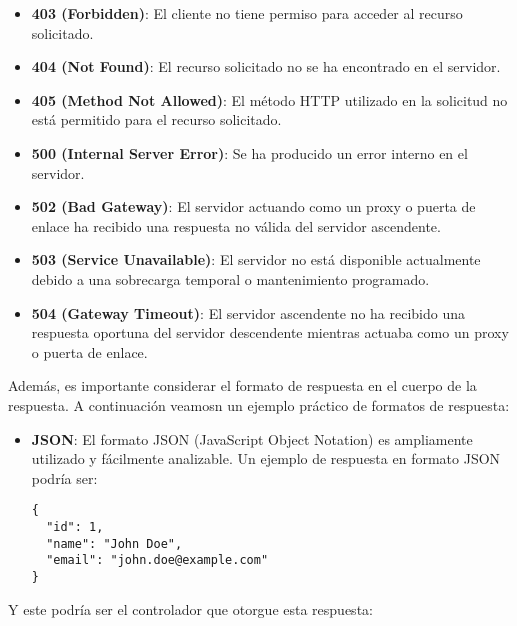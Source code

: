 \documentclass[executivepaper]{article}
\begin{document}
\begin{itemize}
    \item \textbf{403 (Forbidden)}: El cliente no tiene permiso para acceder al recurso solicitado.
    
    \item \textbf{404 (Not Found)}: El recurso solicitado no se ha encontrado en el servidor.
    
    \item \textbf{405 (Method Not Allowed)}: El método HTTP utilizado en la solicitud no está permitido para el recurso solicitado.
    
    \item \textbf{500 (Internal Server Error)}: Se ha producido un error interno en el servidor.
    
    \item \textbf{502 (Bad Gateway)}: El servidor actuando como un proxy o puerta de enlace ha recibido una respuesta no válida del servidor ascendente.
    
    \item \textbf{503 (Service Unavailable)}: El servidor no está disponible actualmente debido a una sobrecarga temporal o mantenimiento programado.
    
    \item \textbf{504 (Gateway Timeout)}: El servidor ascendente no ha recibido una respuesta oportuna del servidor descendente mientras actuaba como un proxy o puerta de enlace.
    
    \end{itemize}

Además, es importante considerar el formato de respuesta en el cuerpo de la respuesta. A continuación veamosn un ejemplo práctico de formatos de respuesta:

\begin{itemize}
  \item \textbf{JSON}: El formato JSON (JavaScript Object Notation) es ampliamente utilizado y fácilmente analizable. Un ejemplo de respuesta en formato JSON podría ser:

 \begin{lstlisting}
{
  "id": 1,
  "name": "John Doe",
  "email": "john.doe@example.com"
}
\end{lstlisting}
\end{itemize}

Y este podría ser el controlador que otorgue esta respuesta:
\end{document}
